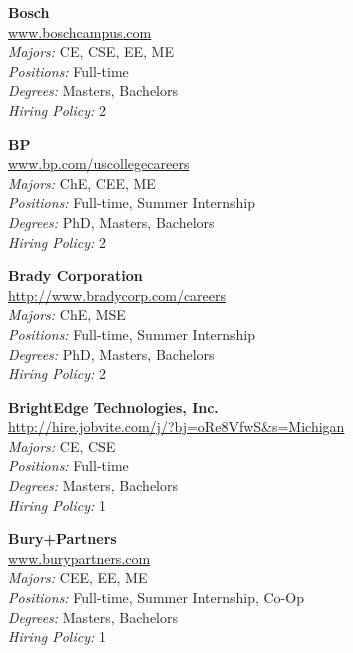 \documentclass[twoside]{article}
\begin{document}
\begin{center}
\begin{multicols}{3}
\begin{minipage}{.9\columnwidth}{\Large\bf Bosch }\\
	\url{www.boschcampus.com}\\
	\emph{Majors:} CE, CSE, EE, ME\\
	\emph{Positions:} Full-time\\
	\emph{Degrees:} Masters, Bachelors\\
	\emph{Hiring Policy:} 2\\
\end{minipage}
 
\begin{minipage}{.9\columnwidth}{\Large\bf BP }\\
	\url{www.bp.com/uscollegecareers}\\
	\emph{Majors:} ChE, CEE, ME\\
	\emph{Positions:} Full-time, Summer Internship\\
	\emph{Degrees:} PhD, Masters, Bachelors\\
	\emph{Hiring Policy:} 2\\
\end{minipage}
 
\begin{minipage}{.9\columnwidth}{\Large\bf Brady Corporation }\\
	\url{http://www.bradycorp.com/careers}\\
	\emph{Majors:} ChE, MSE\\
	\emph{Positions:} Full-time, Summer Internship\\
	\emph{Degrees:} PhD, Masters, Bachelors\\
	\emph{Hiring Policy:} 2\\
\end{minipage}
 
\begin{minipage}{.9\columnwidth}{\Large\bf BrightEdge Technologies, Inc. }\\
	\url{http://hire.jobvite.com/j/?bj=oRe8VfwS&s=Michigan}\\
	\emph{Majors:} CE, CSE\\
	\emph{Positions:} Full-time\\
	\emph{Degrees:} Masters, Bachelors\\
	\emph{Hiring Policy:} 1\\
\end{minipage}
 
\begin{minipage}{.9\columnwidth}{\Large\bf Bury+Partners }\\
	\url{www.burypartners.com}\\
	\emph{Majors:} CEE, EE, ME\\
	\emph{Positions:} Full-time, Summer Internship, Co-Op\\
	\emph{Degrees:} Masters, Bachelors\\
	\emph{Hiring Policy:} 1\\
\end{minipage}
 

\end{multicols}
\end{center}
\end{document}
